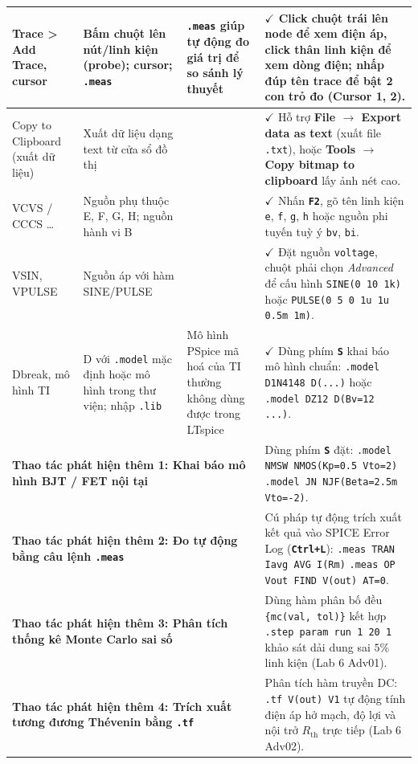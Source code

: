 \documentclass[12pt,a4paper]{article}
\newcommand{\key}[1]{\colorbox{gray!20}{\small\texttt{\textbf{#1}}}}
\begin{document}
{\begin{longtable}{|p{3.2cm}|p{4.2cm}|p{3.2cm}|p{4.2cm}|}
Trace > Add Trace, cursor & Bấm chuột lên nút/linh kiện (probe); cursor; \texttt{.meas} & \texttt{.meas} giúp tự động đo giá trị để so sánh lý thuyết & $\checkmark$ Click chuột trái lên node để xem điện áp, click thân linh kiện để xem dòng điện; nhấp đúp tên trace để bật 2 con trỏ đo (Cursor 1, 2). \\ \hline
Copy to Clipboard (xuất dữ liệu) & Xuất dữ liệu dạng text từ cửa sổ đồ thị & & $\checkmark$ Hỗ trợ \textbf{File $\rightarrow$ Export data as text} (xuất file \texttt{.txt}), hoặc \textbf{Tools $\rightarrow$ Copy bitmap to clipboard} lấy ảnh nét cao. \\ \hline
VCVS / CCCS \dots & Nguồn phụ thuộc E, F, G, H; nguồn hành vi B & & $\checkmark$ Nhấn \key{F2}, gõ tên linh kiện \texttt{e}, \texttt{f}, \texttt{g}, \texttt{h} hoặc nguồn phi tuyến tuỳ ý \texttt{bv}, \texttt{bi}. \\ \hline
VSIN, VPULSE & Nguồn áp với hàm SINE/PULSE & & $\checkmark$ Đặt nguồn \texttt{voltage}, chuột phải chọn \textit{Advanced} để cấu hình \texttt{SINE(0 10 1k)} hoặc \texttt{PULSE(0 5 0 1u 1u 0.5m 1m)}. \\ \hline
Dbreak, mô hình TI & D với \texttt{.model} mặc định hoặc mô hình trong thư viện; nhập \texttt{.lib} & Mô hình PSpice mã hoá của TI thường không dùng được trong LTspice & $\checkmark$ Dùng phím \key{S} khai báo mô hình chuẩn: \newline \texttt{.model D1N4148 D(...)} hoặc \texttt{.model DZ12 D(Bv=12 ...)}. \\ \hline
\multicolumn{3}{|p{10.6cm}|}{\textbf{Thao tác phát hiện thêm 1: Khai báo mô hình BJT / FET nội tại}} & Dùng phím \key{S} đặt: \newline \texttt{.model NMSW NMOS(Kp=0.5 Vto=2)} \newline \texttt{.model JN NJF(Beta=2.5m Vto=-2)}. \\ \hline
\multicolumn{3}{|p{10.6cm}|}{\textbf{Thao tác phát hiện thêm 2: Đo tự động bằng câu lệnh \texttt{.meas}}} & Cú pháp tự động trích xuất kết quả vào SPICE Error Log (\key{Ctrl+L}): \newline \texttt{.meas TRAN Iavg AVG I(Rm)} \newline \texttt{.meas OP Vout FIND V(out) AT=0}. \\ \hline
\multicolumn{3}{|p{10.6cm}|}{\textbf{Thao tác phát hiện thêm 3: Phân tích thống kê Monte Carlo sai số}} & Dùng hàm phân bố đều \texttt{\{mc(val, tol)\}} kết hợp \texttt{.step param run 1 20 1} khảo sát dải dung sai $5\%$ linh kiện (Lab 6 Adv01). \\ \hline
\multicolumn{3}{|p{10.6cm}|}{\textbf{Thao tác phát hiện thêm 4: Trích xuất tương đương Thévenin bằng \texttt{.tf}}} & Phân tích hàm truyền DC: \texttt{.tf V(out) V1} tự động tính điện áp hở mạch, độ lợi và nội trở $R_{\text{th}}$ trực tiếp (Lab 6 Adv02). \\ \hline
\end{longtable}}
\end{document}
